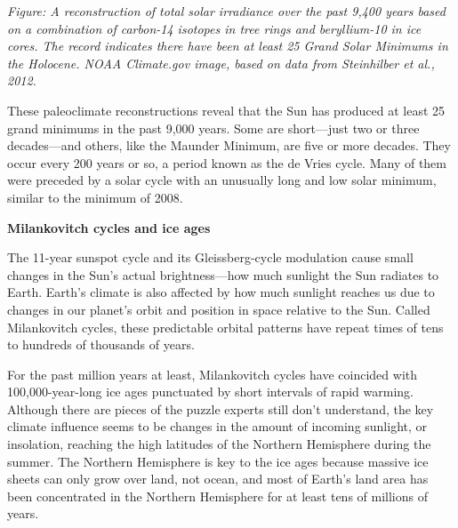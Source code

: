 \documentclass[
]{book}
\begin{document}
\emph{Figure: A reconstruction of total solar irradiance over the past 9,400 years based on a combination of carbon-14 isotopes in tree rings and beryllium-10 in ice cores. The record indicates there have been at least 25 Grand Solar Minimums in the Holocene. NOAA Climate.gov image, based on data from Steinhilber et al., 2012.}

These paleoclimate reconstructions reveal that the Sun has produced at least 25 grand minimums in the past 9,000 years. Some are short---just two or three decades---and others, like the Maunder Minimum, are five or more decades. They occur every 200 years or so, a period known as the de Vries cycle. Many of them were preceded by a solar cycle with an unusually long and low solar minimum, similar to the minimum of 2008.

\textbf{Milankovitch cycles and ice ages}

The 11-year sunspot cycle and its Gleissberg-cycle modulation cause small changes in the Sun's actual brightness---how much sunlight the Sun radiates to Earth. Earth's climate is also affected by how much sunlight reaches us due to changes in our planet's orbit and position in space relative to the Sun. Called Milankovitch cycles, these predictable orbital patterns have repeat times of tens to hundreds of thousands of years.

For the past million years at least, Milankovitch cycles have coincided with 100,000-year-long ice ages punctuated by short intervals of rapid warming. Although there are pieces of the puzzle experts still don't understand, the key climate influence seems to be changes in the amount of incoming sunlight, or insolation, reaching the high latitudes of the Northern Hemisphere during the summer. The Northern Hemisphere is key to the ice ages because massive ice sheets can only grow over land, not ocean, and most of Earth's land area has been concentrated in the Northern Hemisphere for at least tens of millions of years.
\end{document}
